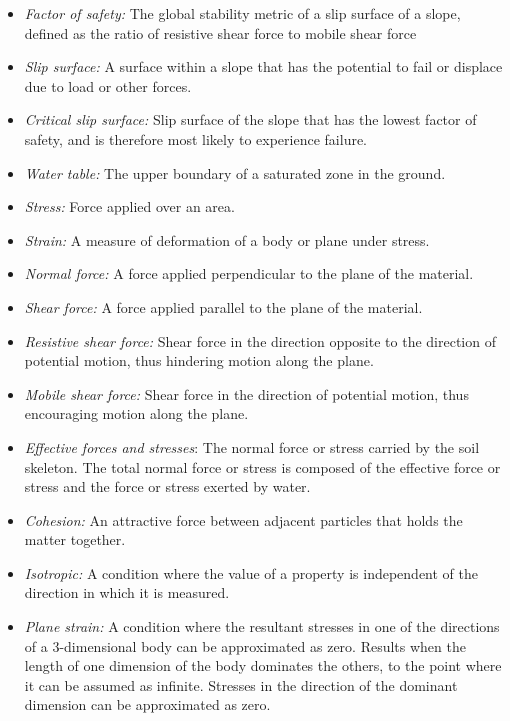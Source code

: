 \documentclass[12pt]{article}
\begin{document}
\begin{itemize}
\item {\textit{Factor of safety:} The global stability metric of a slip surface 
of a slope, defined as the ratio of resistive shear force to mobile shear force}
  
\item {\textit{Slip surface:} A surface within a slope that has the potential 
to fail or displace due to load or other forces.}

\item {\textit{Critical slip surface:} Slip surface of the slope that
  has the lowest factor of safety, and is therefore most likely to
  experience failure.}

\item {\textit{Water table:} The upper boundary of a saturated zone in the 
ground.}

\item {\textit{Stress:} Force applied over an area.}
  
\item {\textit{Strain:} A measure of deformation of a body or plane under 
stress.}
  
\item {\textit{Normal force:} A force applied perpendicular to the
  plane of the material.}
  
\item {\textit{Shear force:} A force applied parallel to the plane of
  the material.}

\item {\textit{Resistive shear force:} Shear force in the direction opposite to 
the direction of potential motion, thus hindering motion along the plane.}
	
\item {\textit{Mobile shear force:} Shear force in the direction of potential 
motion, thus encouraging motion along the plane.}

\item{\textit{Effective forces and stresses}: The normal force or stress 
carried by the soil skeleton. The total normal force or stress is composed of 
the effective force or stress and the force or stress exerted by water.}
	
\item {\textit{Cohesion:} An attractive force between adjacent particles that 
holds the matter together.}
  
\item {\textit{Isotropic:} A condition where the value of a property is 
independent of the direction in which it is measured.}
  
\item {\textit{Plane strain:} A condition where the resultant stresses in one 
of the directions of a 3-dimensional body can be approximated as
  zero. Results when the length of one dimension of the body dominates
  the others, to the point where it can be assumed as infinite. Stresses in the 
  direction of the dominant dimension can be approximated as zero.}

\end{itemize}
\end{document}
